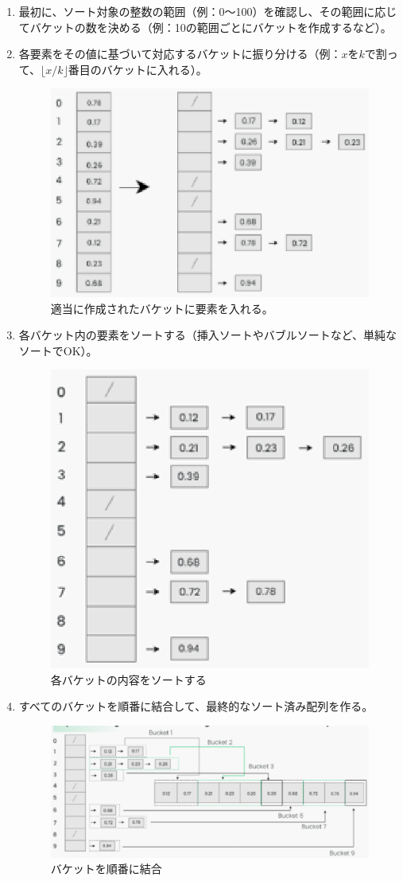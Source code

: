 \documentclass[a4j]{jarticle}
\begin{document}
\begin{enumerate}
  \item 最初に、ソート対象の整数の範囲（例：0〜100）を確認し、その範囲に応じてバケットの数を決める（例：10の範囲ごとにバケットを作成するなど）。
  \item 各要素をその値に基づいて対応するバケットに振り分ける（例：$x$を$k$で割って、$\lfloor x / k \rfloor$番目のバケットに入れる）。
  \begin{figure}[H]
    \centering
    \includegraphics[width=0.8\linewidth]{bucket2.eps}
    \caption{適当に作成されたバケットに要素を入れる。}
  \end{figure}
  \item 各バケット内の要素をソートする（挿入ソートやバブルソートなど、単純なソートでOK）。
  \begin{figure}[H]
    \centering
    \includegraphics[width=0.5\linewidth]{bucket3.eps}
    \caption{各バケットの内容をソートする}
  \end{figure}
  \newpage
  \item すべてのバケットを順番に結合して、最終的なソート済み配列を作る。
  \begin{figure}[H]
    \centering
    \includegraphics[width=0.8\linewidth]{bucket4.eps}
    \caption{バケットを順番に結合}
  \end{figure}
\end{enumerate}
\end{document}
